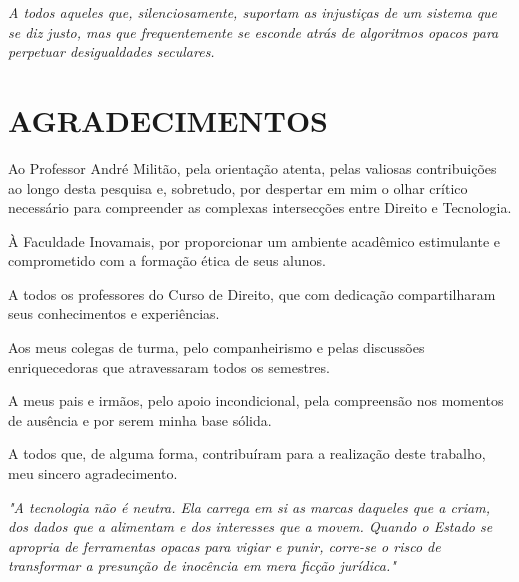 \documentclass[12pt,a4paper]{article}
\begin{document}
\newpage

\thispagestyle{empty}
\begin{center}
\vspace*{6cm}
\textit{A todos aqueles que, silenciosamente, suportam as injustiças de um sistema que se diz justo, mas que frequentemente se esconde atrás de algoritmos opacos para perpetuar desigualdades seculares.}
\end{center}
\newpage

\section*{AGRADECIMENTOS}

Ao Professor André Militão, pela orientação atenta, pelas valiosas contribuições ao longo desta pesquisa e, sobretudo, por despertar em mim o olhar crítico necessário para compreender as complexas intersecções entre Direito e Tecnologia.

À Faculdade Inovamais, por proporcionar um ambiente acadêmico estimulante e comprometido com a formação ética de seus alunos.

A todos os professores do Curso de Direito, que com dedicação compartilharam seus conhecimentos e experiências.

Aos meus colegas de turma, pelo companheirismo e pelas discussões enriquecedoras que atravessaram todos os semestres.

A meus pais e irmãos, pelo apoio incondicional, pela compreensão nos momentos de ausência e por serem minha base sólida.

A todos que, de alguma forma, contribuíram para a realização deste trabalho, meu sincero agradecimento.

\newpage

\thispagestyle{empty}
\begin{flushright}
\vspace*{6cm}
\textit{"A tecnologia não é neutra. Ela carrega em si as marcas daqueles que a criam, dos dados que a alimentam e dos interesses que a movem. Quando o Estado se apropria de ferramentas opacas para vigiar e punir, corre-se o risco de transformar a presunção de inocência em mera ficção jurídica."}
\end{flushright}
\newpage
\end{document}
